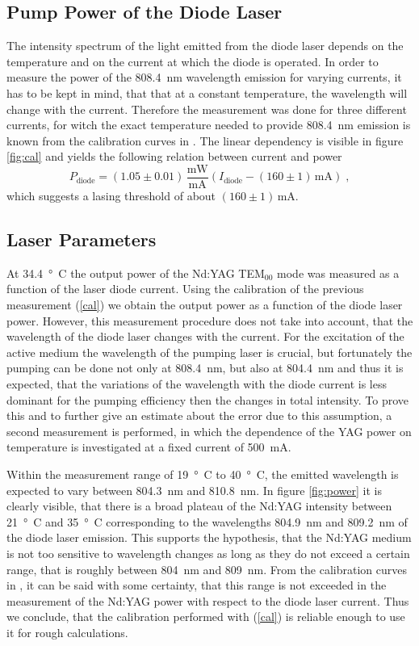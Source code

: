 \documentclass[a4paper]{scrartcl}
\numberwithin{equation}{section}
\numberwithin{figure}{section}
\numberwithin{table}{section}
\newcommand{\eq}[2]{\begin{equation}#1\label{#2}\end{equation}}
\newcommand{\Formel}[1]{(\ref{#1})}
\begin{document}
\subsection{Pump Power of the Diode Laser}
The intensity spectrum of the light emitted from the diode laser depends on the temperature and on the current at which the diode is operated. In order to measure the power of the \SI{808.4}{nm} wavelength emission for varying currents, it has to be kept in mind, that that at a constant temperature, the wavelength will change with the current. Therefore the measurement was done for three different currents, for witch the exact temperature needed to provide \SI{808.4}{nm} emission is known from the calibration curves in \cite{script}. The linear dependency  is visible in figure \ref{fig:cal} and yields the following relation between current and power
\eq{P_\text{diode}=(1.05\pm 0.01)\,\frac{\text{mW}}{\text{mA}}\left(I_\text{diode}-(160\pm 1)\,\text{mA} \right) \;, }{cal}
which suggests a lasing threshold of about $(160\pm 1)\,\text{mA}$. 



\subsection{Laser Parameters}
At \SI{34.4}{\degree C} the output power of the Nd:YAG  TEM$_{00}$ mode was measured as a function of the laser diode current. Using the calibration of the previous measurement \Formel{cal} we obtain the output power as a function of the diode laser power. However, this measurement procedure does not take into account, that the wavelength of the diode laser changes with the current. For the excitation of the active medium the wavelength of the pumping laser is crucial, but fortunately the pumping can be done not only at \SI{808.4}{nm}, but also at \SI{804.4}{nm} and thus it is expected, that the variations of the wavelength with the diode current is less dominant for the pumping efficiency then the changes in total intensity. To prove this and to further give an estimate about the error due to this assumption, a second measurement is performed, in which the dependence of the YAG power on temperature is investigated at a fixed current of \SI{500}{mA}. 

Within the measurement range of \SI{19}{ \degree C} to \SI{40}{\degree  C}, the emitted wavelength is expected to vary between \SI{804.3}{nm} and \SI{810.8}{nm}. In figure \ref{fig:power} it is clearly visible, that there is a broad plateau of the Nd:YAG intensity between \SI{21}{\degree C} and \SI{35}{\degree C} corresponding to the wavelengths \SI{804.9}{nm} and \SI{809.2}{nm} of the diode laser emission. This supports the hypothesis, that the Nd:YAG medium is not too sensitive to wavelength changes as long as they do not exceed a certain range, that is roughly between \SI{804}{nm} and \SI{809}{nm}. From the calibration curves in \cite{script}, it can be said with some certainty, that this range is not exceeded in the measurement of the Nd:YAG power with respect to the diode laser current. Thus we conclude, that the calibration performed with \Formel{cal} is reliable enough to use it for rough calculations.
\end{document}
